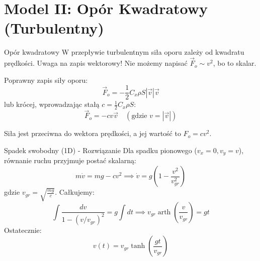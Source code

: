 \documentclass[10pt, aspectratio=43]{beamer}
\DeclareMathOperator{\arth}{arth}
\begin{document}
\section{Model II: Opór Kwadratowy (Turbulentny)}

\begin{frame}{Opór kwadratowy}
    W przepływie turbulentnym siła oporu zależy od kwadratu prędkości.
    \alert{Uwaga na zapis wektorowy!} Nie możemy napisać $\vec{F}_o \sim v^2$, bo to skalar.
    
    Poprawny zapis siły oporu:
    \begin{equation}
        \vec{F}_o = -\frac{1}{2} C_x \rho S |\vec{v}| \vec{v}
    \end{equation}
    lub krócej, wprowadzając stałą $c = \frac{1}{2} C_x \rho S$:
    \begin{equation}
        \vec{F}_o = -c v \vec{v} \quad (\text{gdzie } v = |\vec{v}|)
    \end{equation}
    
    Siła jest przeciwna do wektora prędkości, a jej wartość to $F_o = c v^2$.
\end{frame}

\begin{frame}{Spadek swobodny (1D) - Rozwiązanie}
    Dla spadku pionowego ($v_x=0, v_y=v$), równanie ruchu przyjmuje postać skalarną:
    \begin{equation}
        m\dot{v} = mg - cv^2 \implies \dot{v} = g \left( 1 - \frac{v^2}{v_{gr}^2} \right)
    \end{equation}
    gdzie $v_{gr} = \sqrt{\frac{mg}{c}}$. Całkujemy:
    \begin{equation}
        \int \frac{dv}{1 - (v/v_{gr})^2} = g \int dt \implies v_{gr} \arth\left(\frac{v}{v_{gr}}\right) = gt
    \end{equation}
    Ostatecznie:
    \begin{equation}
        \boxed{v(t) = v_{gr} \tanh\left( \frac{gt}{v_{gr}} \right)}
    \end{equation}
\end{frame}
\end{document}
